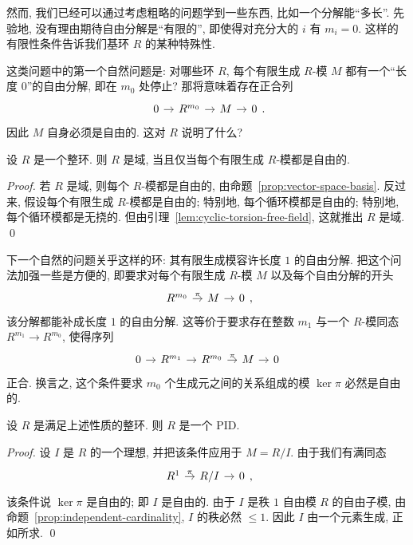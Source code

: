 然而, 我们已经可以通过考虑粗略的问题学到一些东西, 比如一个分解能“多长”. 先验地, 没有理由期待自由分解是“有限的”, 即使得对充分大的 $i$ 有 $m_i=0$. 这样的有限性条件告诉我们基环 $R$ 的某种特殊性.

这类问题中的第一个自然问题是: 对哪些环 $R$, 每个有限生成 $R$-模 $M$ 都有一个“长度 $0$”的自由分解, 即在 $m_0$ 处停止? 那将意味着存在正合列
$$
\begin{tikzcd}[column sep=.9em]
0 \ar[r] & R^{m_0} \ar[r] & M \ar[r] & 0
\end{tikzcd}.
$$
因此 $M$ 自身必须是自由的. 这对 $R$ 说明了什么?

\begin{proposition}\label{prop:field-all-fg-free}
设 $R$ 是一个整环. 则 $R$ 是域, 当且仅当每个有限生成 $R$-模都是自由的.
\end{proposition}

\begin{proof}
若 $R$ 是域, 则每个 $R$-模都是自由的, 由命题~\ref{prop:vector-space-basis}. 反过来, 假设每个有限生成 $R$-模都是自由的; 特别地, 每个循环模都是自由的; 特别地, 每个循环模都是无挠的. 但由引理~\ref{lem:cyclic-torsion-free-field}, 这就推出 $R$ 是域. \qed
\end{proof}

下一个自然的问题关乎这样的环: 其有限生成模容许长度 $1$ 的自由分解. 把这个问法加强一些是方便的, 即要求对每个有限生成 $R$-模 $M$ 以及每个自由分解的开头
$$
\begin{tikzcd}[column sep=.9em]
R^{m_0} \ar[r,"\pi"] & M \ar[r] & 0
\end{tikzcd},
$$
该分解都能补成长度 $1$ 的自由分解. 这等价于要求存在整数 $m_1$ 与一个 $R$-模同态 $R^{m_1}\to R^{m_0}$, 使得序列
$$
\begin{tikzcd}[column sep=.9em]
0 \ar[r] & R^{m_1} \ar[r] & R^{m_0} \ar[r,"\pi"] & M \ar[r] & 0
\end{tikzcd}
$$
正合. 换言之, 这个条件要求 $m_0$ 个生成元之间的关系组成的模 $\ker\pi$ 必然是自由的.

\begin{claim}\label{claim:pid-resolution-length1}
设 $R$ 是满足上述性质的整环. 则 $R$ 是一个 PID.
\end{claim}

\begin{proof}
设 $I$ 是 $R$ 的一个理想, 并把该条件应用于 $M=R/I$. 由于我们有满同态
$$
\begin{tikzcd}[column sep=.9em]
R^1 \ar[r,"\pi"] & R/I \ar[r] & 0
\end{tikzcd},
$$
该条件说 $\ker\pi$ 是自由的; 即 $I$ 是自由的. 由于 $I$ 是秩 $1$ 自由模 $R$ 的自由子模, 由命题~\ref{prop:independent-cardinality}, $I$ 的秩必然 $\leq 1$. 因此 $I$ 由一个元素生成, 正如所求. \qed
\end{proof}

